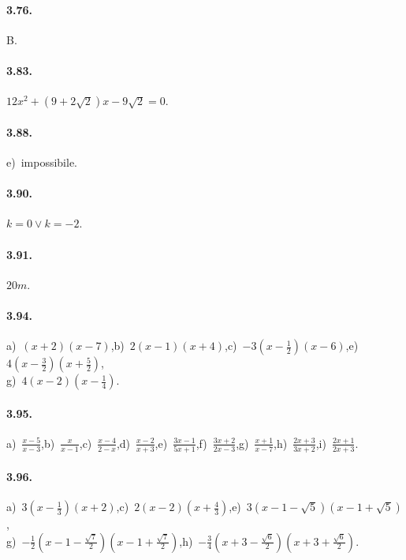 \paragraph{3.76.} B.

\paragraph{3.83.} $12x^2+(9+2\sqrt{2})x-9\sqrt{2}=0$.

\paragraph{3.88.} e)~impossibile.

\paragraph{3.90.} $k=0\vee k=-2$.

\paragraph{3.91.} $20\unit{m}$.

\paragraph{3.94.} a)~$(x + 2) (x-7)$,\quad b)~$2 (x-1) (x + 4)$,\quad c)~$- 3 \left(x-\frac{1}{2} \right) (x-6)$,\quad e)~$4 \left(x-\frac{3}{2} \right) \left(x + \frac{5}{2} \right)$,\protect\\
g)~$4 (x-2) \left(x-\frac{1}{4} \right)$.

\paragraph{3.95.} a)~$\frac{x-5}{x-3}$,\quad b)~$\frac{x}{x-1}$,\quad c)~$\frac{x-4}{2-x}$,\quad d)~$\frac{x-2}{x+3}$,\quad e)~$\frac{3x-1}{5x+1}$,\quad f)~$\frac{3x+2}{2x-3}$,\quad g)~$\frac{x+1}{x-7}$,\quad h)~$\frac{2x+3}{3x+2}$,\quad i)~$\frac{2x+1}{2x+3}$. %


\paragraph{3.96.} a)~$3 \left(x-\frac{1}{3} \right) (x + 2)$,\quad c)~$2 (x-2) \left(x + \frac{4}{3} \right)$,\quad e)~$3 \left(x-1-\sqrt{5} \right) \left(x-1 + \sqrt{5} \right)$,\protect\\
g)~$- \frac{1}{2} \left(x-1-\frac{\sqrt{7}}{2} \right) \left(x- 1 + \frac{\sqrt{7}}{2} \right)$,\quad h)~$- \frac{3}{4} \left(x + 3-\frac{\sqrt{6}}{2} \right) \left(x+ 3 + \frac{\sqrt{6}}{2} \right)$.

